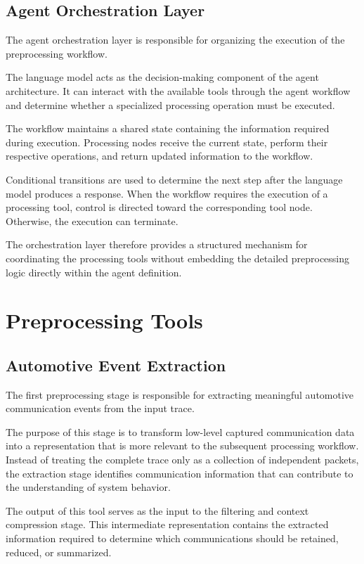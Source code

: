 \subsection{Agent Orchestration Layer}

The agent orchestration layer is responsible for organizing the execution of the preprocessing workflow.

The language model acts as the decision-making component of the agent architecture. It can interact with the available tools through the agent workflow and determine whether a specialized processing operation must be executed.

The workflow maintains a shared state containing the information required during execution. Processing nodes receive the current state, perform their respective operations, and return updated information to the workflow.

Conditional transitions are used to determine the next step after the language model produces a response. When the workflow requires the execution of a processing tool, control is directed toward the corresponding tool node. Otherwise, the execution can terminate.

The orchestration layer therefore provides a structured mechanism for coordinating the processing tools without embedding the detailed preprocessing logic directly within the agent definition.

\section{Preprocessing Tools}

\subsection{Automotive Event Extraction}

The first preprocessing stage is responsible for extracting meaningful automotive communication events from the input trace.

The purpose of this stage is to transform low-level captured communication data into a representation that is more relevant to the subsequent processing workflow. Instead of treating the complete trace only as a collection of independent packets, the extraction stage identifies communication information that can contribute to the understanding of system behavior.

The output of this tool serves as the input to the filtering and context compression stage. This intermediate representation contains the extracted information required to determine which communications should be retained, reduced, or summarized.


